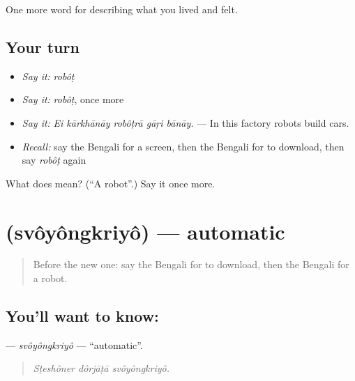 \begin{grammarlens}[title={What you've built}]
One more word for describing what you lived and felt.
\end{grammarlens}

\subsection*{Your turn}
\begin{itemize}
\raggedright
  \item \emph{Say it:} \emph{robôṭ}
  \item \emph{Say it:} \emph{robôṭ}, once more
  \item \emph{Say it:} \emph{Ei kārkhānāy robôṭrā gāṛi bānāy.} — In this factory robots build cars.
  \item \emph{Recall:} say the Bengali for a screen, then the Bengali for to download, then say \emph{robôṭ} again
\end{itemize}

\begin{tcolorbox}[breakable,colback=teal!4,colframe=teal!35!black,title={Before you move on}]
What does  mean? (\textquotedblleft{}A robot\textquotedblright{}.) Say it once more.
\end{tcolorbox}
\section[\texorpdfstring{\bn{স্বয়ংক্রিয়} (svôyôngkriyô)}{স্বয়ংক্রিয় (svôyôngkriyô)}]{ (svôyôngkriyô) — automatic}

\label{lesson:BN-C504-svoyongkriyo}



\begin{quote}
Before the new one: say the Bengali for to download, then the Bengali for a robot.
\end{quote}

\subsection*{You'll want to know: }
\textbf{} — \emph{svôyôngkriyô} — \textquotedblleft{}automatic\textquotedblright{}.

\begin{quote}
  
\end{quote}

\begin{quote}
\emph{Sṭeshôner dôrjāṭā svôyôngkriyô.}
\end{quote}

